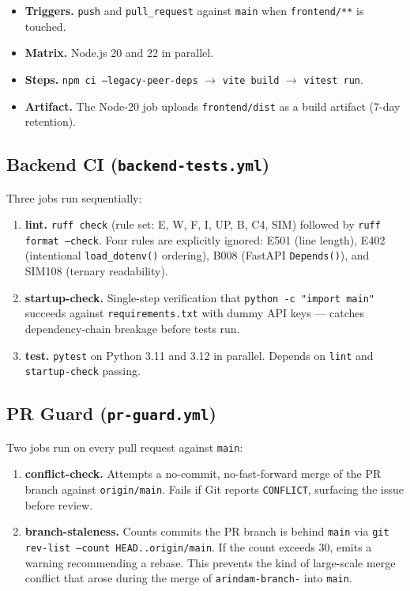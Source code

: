 \documentclass[11pt, a4paper]{article}
\newcommand{\code}[1]{\texttt{\small#1}}
\begin{document}
\begin{itemize}[leftmargin=*, itemsep=2pt, topsep=2pt]
  \item \textbf{Triggers.} \code{push} and \code{pull\_request} against \code{main} when \code{frontend/**} is touched.
  \item \textbf{Matrix.} Node.js 20 and 22 in parallel.
  \item \textbf{Steps.} \code{npm ci --legacy-peer-deps} $\rightarrow$ \code{vite build} $\rightarrow$ \code{vitest run}.
  \item \textbf{Artifact.} The Node-20 job uploads \code{frontend/dist} as a build artifact (7-day retention).
\end{itemize}

\subsection{Backend CI (\texttt{backend-tests.yml})}

Three jobs run sequentially:

\begin{enumerate}[leftmargin=*, itemsep=2pt, topsep=2pt]
  \item \textbf{lint.} \code{ruff check} (rule set: E, W, F, I, UP, B, C4, SIM) followed by \code{ruff format --check}. Four rules are explicitly ignored: E501 (line length), E402 (intentional \code{load\_dotenv()} ordering), B008 (FastAPI \code{Depends()}), and SIM108 (ternary readability).
  \item \textbf{startup-check.} Single-step verification that \code{python -c "import main"} succeeds against \code{requirements.txt} with dummy API keys --- catches dependency-chain breakage before tests run.
  \item \textbf{test.} \code{pytest} on Python 3.11 and 3.12 in parallel. Depends on \code{lint} and \code{startup-check} passing.
\end{enumerate}

\subsection{PR Guard (\texttt{pr-guard.yml})}

Two jobs run on every pull request against \code{main}:

\begin{enumerate}[leftmargin=*, itemsep=2pt, topsep=2pt]
  \item \textbf{conflict-check.} Attempts a no-commit, no-fast-forward merge of the PR branch against \code{origin/main}. Fails if Git reports \code{CONFLICT}, surfacing the issue before review.
  \item \textbf{branch-staleness.} Counts commits the PR branch is behind \code{main} via \code{git rev-list --count HEAD..origin/main}. If the count exceeds 30, emits a warning recommending a rebase. This prevents the kind of large-scale merge conflict that arose during the merge of \code{arindam-branch-} into \code{main}.
\end{enumerate}
\end{document}

